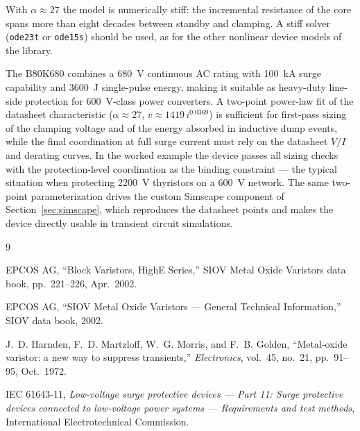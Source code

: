 \documentclass[11pt,a4paper]{article}
\begin{document}
With $\alpha \approx 27$ the model is numerically stiff: the incremental
resistance of the core spans more than eight decades between standby and
clamping. A stiff solver (\texttt{ode23t} or \texttt{ode15s}) should be
used, as for the other nonlinear device models of the library.



The B80K680 combines a \SI{680}{\volt} continuous AC rating with
\SI{100}{\kilo\ampere} surge capability and \SI{3600}{\joule} single-pulse
energy, making it suitable as heavy-duty line-side protection for
\SI{600}{\volt}-class power converters. A two-point power-law fit of the
datasheet characteristic ($\alpha \approx 27$,
$v \approx 1419\,i^{0.0369}$) is sufficient for first-pass sizing of the
clamping voltage and of the energy absorbed in inductive dump events, while
the final coordination at full surge current must rely on the datasheet
$V/I$ and derating curves. In the worked example the device passes all
sizing checks with the protection-level coordination as the binding
constraint --- the typical situation when protecting \SI{2200}{\volt}
thyristors on a \SI{600}{\volt} network. The same two-point
parameterization drives the custom Simscape component of
Section~\ref{sec:simscape}, which reproduces the datasheet points and makes
the device directly usable in transient circuit simulations.

\begin{thebibliography}{9}

EPCOS AG, ``Block Varistors, HighE Series,'' SIOV Metal Oxide Varistors
data book, pp.~221--226, Apr.~2002.

EPCOS AG, ``SIOV Metal Oxide Varistors --- General Technical Information,''
SIOV data book, 2002.

J.~D. Harnden, F.~D. Martzloff, W.~G. Morris, and F.~B. Golden,
``Metal-oxide varistor: a new way to suppress transients,''
\emph{Electronics}, vol.~45, no.~21, pp.~91--95, Oct.~1972.

IEC 61643-11, \emph{Low-voltage surge protective devices --- Part 11:
Surge protective devices connected to low-voltage power systems ---
Requirements and test methods}, International Electrotechnical Commission.

\end{thebibliography}
\end{document}
